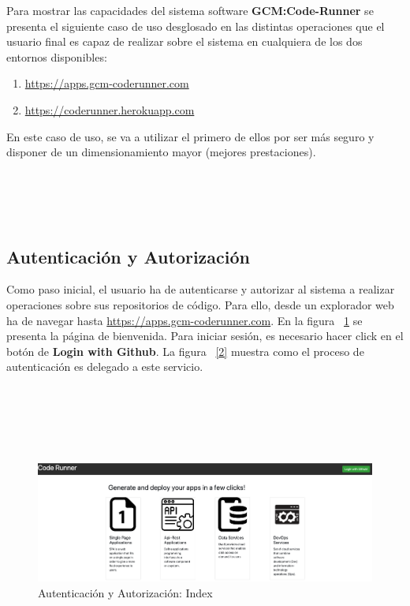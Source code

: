\documentclass[a4paper,11pt]{book}
\begin{document}
Para mostrar las capacidades del sistema software \textbf{GCM:Code-Runner} se presenta el siguiente caso de uso desglosado en las distintas operaciones que el usuario final es capaz de realizar sobre el sistema en cualquiera de los dos entornos disponibles:
~\\

\begin{enumerate}
\item \url{https://apps.gcm-coderunner.com}
\item \url{https://coderunner.herokuapp.com}
\end{enumerate}

En este caso de uso, se va a utilizar el primero de ellos por ser más seguro y disponer de un dimensionamiento mayor (mejores prestaciones).
~\\
~\\
~\\
~\\
~\\

\subsection{Autenticación y Autorización}

Como paso inicial, el usuario ha de autenticarse y autorizar al sistema a realizar operaciones sobre sus repositorios de código. Para ello, desde un explorador web ha de navegar hasta \url{https://apps.gcm-coderunner.com}. En la figura ~\ref{1} se presenta la página de bienvenida. Para iniciar sesión, es necesario hacer click en el botón de \textbf{Login with Github}. La figura ~\ref{2} muestra como el proceso de autenticación es delegado a este servicio. 
~\\
~\\
~\\
~\\
~\\
~\\


\begin{figure}[H]
\centering
\includegraphics[scale=0.2]{imagenes/casouso/1_a.png}
\caption{  Autenticación y Autorización: Index }
\label{1}
\end{figure}
\end{document}
